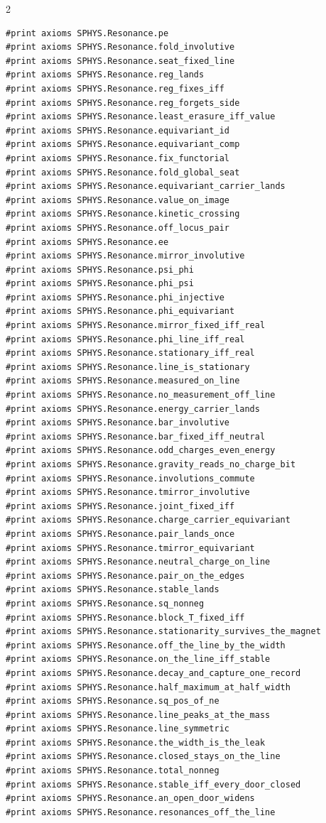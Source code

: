 \documentclass[10pt]{article}
\begin{document}
\begin{multicols}{2}
\begin{Verbatim}[fontsize=\fontsize{5.9}{6.8}\selectfont,breaklines,breakanywhere,breaksymbolleft={}]
#print axioms SPHYS.Resonance.pe
#print axioms SPHYS.Resonance.fold_involutive
#print axioms SPHYS.Resonance.seat_fixed_line
#print axioms SPHYS.Resonance.reg_lands
#print axioms SPHYS.Resonance.reg_fixes_iff
#print axioms SPHYS.Resonance.reg_forgets_side
#print axioms SPHYS.Resonance.least_erasure_iff_value
#print axioms SPHYS.Resonance.equivariant_id
#print axioms SPHYS.Resonance.equivariant_comp
#print axioms SPHYS.Resonance.fix_functorial
#print axioms SPHYS.Resonance.fold_global_seat
#print axioms SPHYS.Resonance.equivariant_carrier_lands
#print axioms SPHYS.Resonance.value_on_image
#print axioms SPHYS.Resonance.kinetic_crossing
#print axioms SPHYS.Resonance.off_locus_pair
#print axioms SPHYS.Resonance.ee
#print axioms SPHYS.Resonance.mirror_involutive
#print axioms SPHYS.Resonance.psi_phi
#print axioms SPHYS.Resonance.phi_psi
#print axioms SPHYS.Resonance.phi_injective
#print axioms SPHYS.Resonance.phi_equivariant
#print axioms SPHYS.Resonance.mirror_fixed_iff_real
#print axioms SPHYS.Resonance.phi_line_iff_real
#print axioms SPHYS.Resonance.stationary_iff_real
#print axioms SPHYS.Resonance.line_is_stationary
#print axioms SPHYS.Resonance.measured_on_line
#print axioms SPHYS.Resonance.no_measurement_off_line
#print axioms SPHYS.Resonance.energy_carrier_lands
#print axioms SPHYS.Resonance.bar_involutive
#print axioms SPHYS.Resonance.bar_fixed_iff_neutral
#print axioms SPHYS.Resonance.odd_charges_even_energy
#print axioms SPHYS.Resonance.gravity_reads_no_charge_bit
#print axioms SPHYS.Resonance.involutions_commute
#print axioms SPHYS.Resonance.tmirror_involutive
#print axioms SPHYS.Resonance.joint_fixed_iff
#print axioms SPHYS.Resonance.charge_carrier_equivariant
#print axioms SPHYS.Resonance.pair_lands_once
#print axioms SPHYS.Resonance.tmirror_equivariant
#print axioms SPHYS.Resonance.neutral_charge_on_line
#print axioms SPHYS.Resonance.pair_on_the_edges
#print axioms SPHYS.Resonance.stable_lands
#print axioms SPHYS.Resonance.sq_nonneg
#print axioms SPHYS.Resonance.block_T_fixed_iff
#print axioms SPHYS.Resonance.stationarity_survives_the_magnet
#print axioms SPHYS.Resonance.off_the_line_by_the_width
#print axioms SPHYS.Resonance.on_the_line_iff_stable
#print axioms SPHYS.Resonance.decay_and_capture_one_record
#print axioms SPHYS.Resonance.half_maximum_at_half_width
#print axioms SPHYS.Resonance.sq_pos_of_ne
#print axioms SPHYS.Resonance.line_peaks_at_the_mass
#print axioms SPHYS.Resonance.line_symmetric
#print axioms SPHYS.Resonance.the_width_is_the_leak
#print axioms SPHYS.Resonance.closed_stays_on_the_line
#print axioms SPHYS.Resonance.total_nonneg
#print axioms SPHYS.Resonance.stable_iff_every_door_closed
#print axioms SPHYS.Resonance.an_open_door_widens
#print axioms SPHYS.Resonance.resonances_off_the_line
\end{Verbatim}
\end{multicols}
\end{document}
